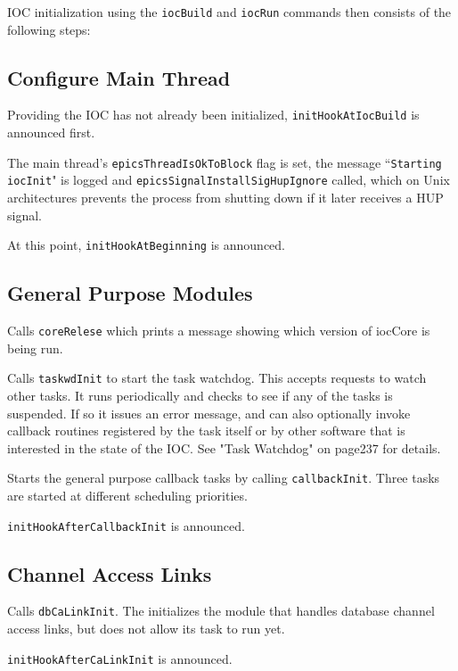 IOC initialization using the \verb|iocBuild| and \verb|iocRun| commands then consists of the following steps:

\subsection{Configure Main Thread}

Providing the IOC has not already been initialized, \verb|initHookAtIocBuild| is announced first.

The main thread's \verb|epicsThreadIsOkToBlock| flag is set, the message ``\verb|Starting iocInit|" is logged and 
\verb|epicsSignalInstallSigHupIgnore| called, which on Unix architectures prevents the process from shutting down 
if it later receives a HUP signal.

At this point, \verb|initHookAtBeginning| is announced.

\subsection{General Purpose Modules}

Calls \verb|coreRelese| which prints a message showing which version of iocCore is being run.

Calls \verb|taskwdInit| to start the task watchdog. This accepts requests to watch other tasks. It runs periodically and checks 
to see if any of the tasks is suspended. If so it issues an error message, and can also optionally invoke callback routines 
registered by the task itself or by other software that is interested in the state of the IOC. See "Task Watchdog" on 
page237 for details.

Starts the general purpose callback tasks by calling \verb|callbackInit|. Three tasks are started at different scheduling 
priorities.

\verb|initHookAfterCallbackInit| is announced.

\subsection{Channel Access Links}

Calls \verb|dbCaLinkInit|. The initializes the module that handles database channel access links, but does not allow its task 
to run yet.

\verb|initHookAfterCaLinkInit| is announced.

